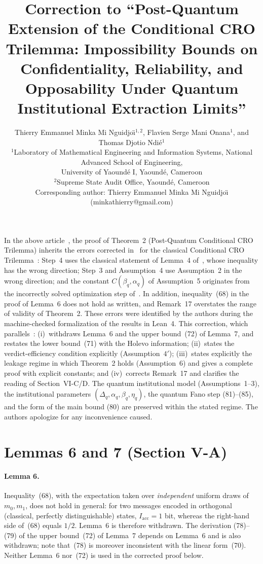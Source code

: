 \documentclass[10pt,a4paper]{article}
\title{\textbf{Correction to ``Post-Quantum Extension of the Conditional CRO
Trilemma: Impossibility Bounds on Confidentiality, Reliability, and
Opposability Under Quantum Institutional Extraction Limits''}}
\author{Thierry Emmanuel Minka Mi Nguidjo\"{\i}$^{1,2}$,
        Flavien Serge Mani Onana$^{1}$,
        and Thomas Djotio Ndi\'e$^{1}$\\[4pt]
\small $^{1}$Laboratory of Mathematical Engineering and Information Systems,
National Advanced School of Engineering,\\
\small University of Yaound\'e I, Yaound\'e, Cameroon\\
\small $^{2}$Supreme State Audit Office, Yaound\'e, Cameroon\\[2pt]
\small Corresponding author: Thierry Emmanuel Minka Mi Nguidjo\"{\i}
(minkathierry@gmail.com)}
\date{}
\theoremstyle{remark}
\begin{document}
\maketitle

\noindent In the above article~\cite{pq}, the proof of Theorem~2
(Post-Quantum Conditional CRO Trilemma) inherits the errors corrected
in~\cite{cor1} for the classical Conditional CRO Trilemma~\cite{cro}:
Step~4 uses the classical statement of Lemma~4 of~\cite{cro}, whose
inequality has the wrong direction; Step~3 and Assumption~4 use
Assumption~2 in the wrong direction; and the constant $C(\beta_q,\alpha_q)$
of Assumption~5 originates from the incorrectly solved optimization step
of~\cite{cro}. In addition, inequality~(68) in the proof of Lemma~6 does
not hold as written, and Remark~17 overstates the range of validity of
Theorem~2. These errors were identified by the authors during the
machine-checked formalization of the results in Lean~4. This correction,
which parallels~\cite{cor1}:
(i)~withdraws Lemma~6 and the upper bound~(72) of Lemma~7, and restates the
lower bound~(71) with the Holevo information;
(ii)~states the verdict-efficiency condition explicitly (Assumption~$4'$);
(iii)~states explicitly the leakage regime in which Theorem~2 holds
(Assumption~6) and gives a complete proof with explicit constants; and
(iv)~corrects Remark~17 and clarifies the reading of Section~VI-C/D.
The quantum institutional model (Assumptions~1--3), the institutional
parameters $(\Delta_q,\alpha_q,\beta_q,\eta_q)$, the quantum Fano step
(81)--(85), and the form of the main bound (80) are preserved within the
stated regime. The authors apologize for any inconvenience caused.

\section{Lemmas 6 and 7 (Section V-A)}

\paragraph{Lemma 6.} Inequality~(68), with the expectation taken over
\emph{independent} uniform draws of $m_0,m_1$, does not hold in general:
for two messages encoded in orthogonal (classical, perfectly
distinguishable) states, $I_{\mathrm{acc}}=1$ bit, whereas the right-hand
side of~(68) equals $1/2$. Lemma~6 is therefore withdrawn. The derivation
(78)--(79) of the upper bound~(72) of Lemma~7 depends on Lemma~6 and is
also withdrawn; note that~(78) is moreover inconsistent with the linear
form~(70). Neither Lemma~6 nor~(72) is used in the corrected proof below.
\end{document}
